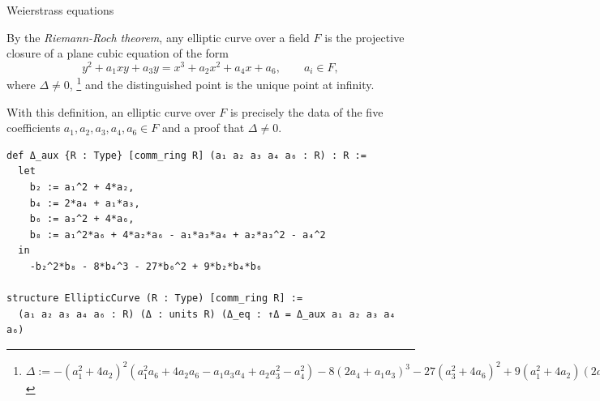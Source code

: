 \documentclass[10pt]{beamer}
\begin{document}
\begin{frame}[fragile, t]{Weierstrass equations}

By the \emph{Riemann-Roch theorem}, any elliptic curve over a field $ F $ is the projective closure of a plane cubic equation of the form
$$ y^2 + a_1xy + a_3y = x^3 + a_2x^2 + a_4x + a_6, \qquad a_i \in F, $$
where $ \Delta \ne 0 $, \footnote{\tiny $ \Delta := -(a_1^2 + 4a_2)^2(a_1^2a_6 + 4a_2a_6 - a_1a_3a_4 + a_2a_3^2 - a_4^2) - 8(2a_4 + a_1a_3)^3 - 27(a_3^2 + 4a_6)^2 + 9(a_1^2 + 4a_2)(2a_4 + a_1a_3)(a_3^2 + 4a_6) $} and the distinguished point is the unique point at infinity.

\vspace{0.5cm}

With this definition, an elliptic curve over $ F $ is precisely the data of the five coefficients $ a_1, a_2, a_3, a_4, a_6 \in F $ and a proof that $ \Delta \ne 0 $.

\begin{lstlisting}[basicstyle=\scriptsize, frame=single]
def Δ_aux {R : Type} [comm_ring R] (a₁ a₂ a₃ a₄ a₆ : R) : R :=
  let
    b₂ := a₁^2 + 4*a₂,
    b₄ := 2*a₄ + a₁*a₃,
    b₆ := a₃^2 + 4*a₆,
    b₈ := a₁^2*a₆ + 4*a₂*a₆ - a₁*a₃*a₄ + a₂*a₃^2 - a₄^2
  in
    -b₂^2*b₈ - 8*b₄^3 - 27*b₆^2 + 9*b₂*b₄*b₆

structure EllipticCurve (R : Type) [comm_ring R] :=
  (a₁ a₂ a₃ a₄ a₆ : R) (Δ : units R) (Δ_eq : ↑Δ = Δ_aux a₁ a₂ a₃ a₄ a₆)
\end{lstlisting}

\end{frame}
\end{document}
